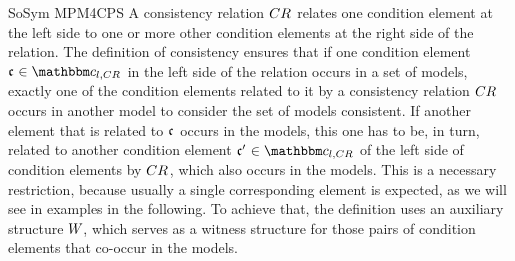 \begin{copiedFrom}{SoSym MPM4CPS}
A consistency relation $CR_{}$ relates one condition element at the left side to one or more other condition elements at the right side of the relation.
The definition of consistency ensures that if one condition element $\conditionelement{c}{} \in \condition{c}{l,\consistencyrelation{CR}{}}$ in the left side of the relation occurs in a set of models, exactly one of the condition elements related to it by a consistency relation $CR_{}$ occurs in another model to consider the set of models consistent.
If another element that is related to $\mathfrak{c}_{}$ occurs in the models, this one has to be, in turn, related to another condition element $\conditionelement{c'}{} \in \condition{c}{l,\consistencyrelation{CR}{}}$ of the left side of condition elements by $CR_{}$, which also occurs in the models.
This is a necessary restriction, because usually a single corresponding element is expected, as we will see in examples in the following.
To achieve that, the definition uses an auxiliary structure $W_{}$, which serves as a witness structure for those pairs of condition elements that co-occur in the models.


\end{copiedFrom}
